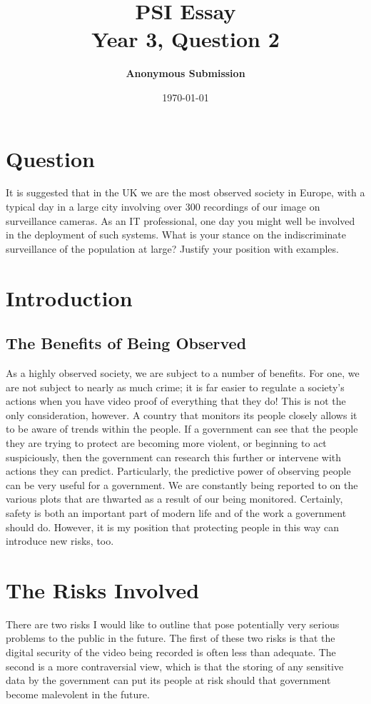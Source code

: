 \documentclass[10pt, draft]{article}
\author{\textbf{Anonymous Submission}}
\date{\today}
\title{PSI Essay \\
Year 3, Question 2 \\
}
\begin{document}
\maketitle

\section{Question} \par
It is suggested that in the UK we are the most observed society in Europe, with a typical day in a large city involving over 300 recordings of our image on surveillance cameras. As an IT professional, one day you might well be involved in the deployment of such systems. What is your stance on the indiscriminate surveillance of the population at large? Justify your position with examples. \par

\section{Introduction} \par
\subsection{The Benefits of Being Observed} \par
As a highly observed society, we are subject to a number of benefits. For one, we are not subject to nearly as much crime; it is far easier to regulate a society's actions when you have video proof of everything that they do! This is not the only consideration, however. A country that monitors its people closely allows it to be aware of trends within the people. If a government can see that the people they are trying to protect are becoming more violent, or beginning to act suspiciously, then the government can research this further or intervene with actions they can predict. Particularly, the predictive power of observing people can be very useful for a government. We are constantly being reported to on the various plots that are thwarted as a result of our being monitored. Certainly, safety is both an important part of modern life and of the work a government should do. However, it is my position that protecting people in this way can introduce new risks, too. \par

\section{The Risks Involved}\par
There are two risks I would like to outline that pose potentially very serious problems to the public in the future. The first of these two risks is that the digital security of the video being recorded is often less than adequate. The second is a more contraversial view, which is that the storing of any sensitive data by the government can put its people at risk should that government become malevolent in the future.\par
\end{document}
